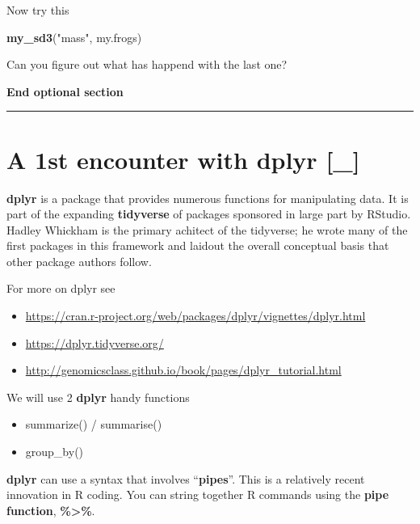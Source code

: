\documentclass[]{book}
\newenvironment{Shaded}{\begin{snugshade}}{\end{snugshade}}
\newcommand{\KeywordTok}[1]{\textcolor[rgb]{0.13,0.29,0.53}{\textbf{#1}}}
\newcommand{\StringTok}[1]{\textcolor[rgb]{0.31,0.60,0.02}{#1}}
\newcommand{\NormalTok}[1]{#1}
\providecommand{\tightlist}{%
  \setlength{\itemsep}{0pt}\setlength{\parskip}{0pt}}
\theoremstyle{definition}
\theoremstyle{definition}
\theoremstyle{definition}
\theoremstyle{remark}
\begin{document}
Now try this

\begin{Shaded}
\begin{Highlighting}[]
\KeywordTok{my_sd3}\NormalTok{(}\StringTok{"mass"}\NormalTok{, my.frogs)}
\end{Highlighting}
\end{Shaded}

Can you figure out what has happend with the last one?

\textbf{End optional section}

\begin{center}\rule{0.5\linewidth}{\linethickness}\end{center}

\section{A 1st encounter with dplyr
{[}\_{]}}\label{a-1st-encounter-with-dplyr-_}

\textbf{dplyr} is a package that provides numerous functions for
manipulating data. It is part of the expanding \textbf{tidyverse} of
packages sponsored in large part by RStudio. Hadley Whickham is the
primary achitect of the tidyverse; he wrote many of the first packages
in this framework and laidout the overall conceptual basis that other
package authors follow.

For more on dplyr see

\begin{itemize}
\tightlist
\item
  \url{https://cran.r-project.org/web/packages/dplyr/vignettes/dplyr.html}
\item
  \url{https://dplyr.tidyverse.org/}
\item
  \url{http://genomicsclass.github.io/book/pages/dplyr_tutorial.html}
\end{itemize}

We will use 2 \textbf{dplyr} handy functions

\begin{itemize}
\tightlist
\item
  summarize() / summarise()
\item
  group\_by()
\end{itemize}

\textbf{dplyr} can use a syntax that involves ``\textbf{pipes}''. This
is a relatively recent innovation in R coding. You can string together R
commands using the \textbf{pipe function}, \textbf{\%\textgreater{}\%}.
\end{document}
